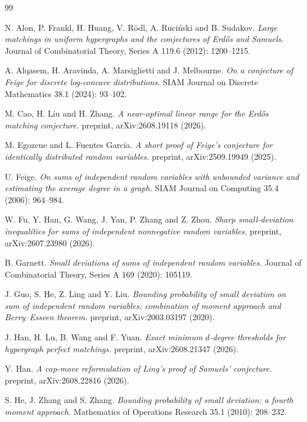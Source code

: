 \documentclass[10pt,a4paper]{article}
\begin{document}
\begin{thebibliography}{99}

N. Alon, P. Frankl, H. Huang, V. R\"odl, A. Ruci\'nski and B. Sudakov.
\emph{Large matchings in uniform hypergraphs and the conjectures of Erd\H{o}s and Samuels.}
Journal of Combinatorial Theory, Series A 119.6 (2012): 1200--1215.

A. Alqasem, H. Aravinda, A. Marsiglietti and J. Melbourne.
\emph{On a conjecture of Feige for discrete log-concave distributions.}
SIAM Journal on Discrete Mathematics 38.1 (2024): 93--102.

M. Cao, H. Liu and H. Zhang.
\emph{A near-optimal linear range for the Erd\H{o}s matching conjecture.}
preprint, arXiv:2608.19118 (2026).

M. Egozcue and L. Fuentes Garc\'ia.
\emph{A short proof of Feige's conjecture for identically distributed random variables.}
preprint, arXiv:2509.19949 (2025).

U. Feige.
\emph{On sums of independent random variables with unbounded variance and estimating the average degree in a graph.}
SIAM Journal on Computing 35.4 (2006): 964--984.

W. Fu, Y. Han, G. Wang, J. Yan, P. Zhang and Z. Zhou.
\emph{Sharp small-deviation inequalities for sums of independent nonnegative random variables.}
preprint, arXiv:2607.23980 (2026).

B. Garnett.
\emph{Small deviations of sums of independent random variables.}
Journal of Combinatorial Theory, Series A 169 (2020): 105119.

J. Guo, S. He, Z. Ling and Y. Liu.
\emph{Bounding probability of small deviation on sum of independent random variables: combination of moment approach and Berry--Esseen theorem.}
preprint, arXiv:2003.03197 (2020).

J. Han, H. Lu, B. Wang and F. Yuan.
\emph{Exact minimum $d$-degree thresholds for hypergraph perfect matchings.}
preprint, arXiv:2608.21347 (2026).

Y. Han.
\emph{A cap-move reformulation of Ling's proof of Samuels' conjecture.}
preprint, arXiv:2608.22816 (2026).

S. He, J. Zhang and S. Zhang.
\emph{Bounding probability of small deviation: a fourth moment approach.}
Mathematics of Operations Research 35.1 (2010): 208--232.


\end{thebibliography}
\end{document}
